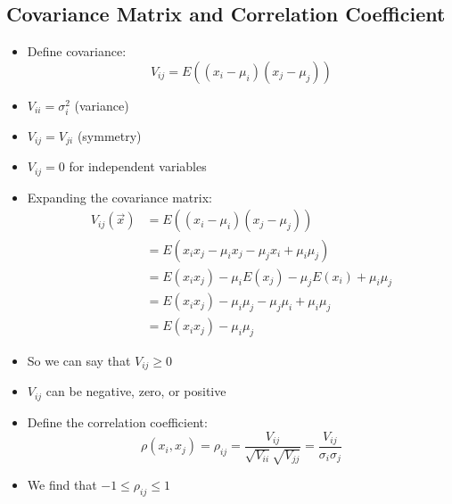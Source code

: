 \subsection{Covariance Matrix and Correlation Coefficient}
\begin{itemize}
      \item Define covariance:
            \[ V_{ij} = E((x_i - \mu_i)(x_j - \mu_j)) \]
      \item $V_{ii} = \sigma_i^2$ (variance)
      \item $V_{ij} = V_{ji}$ (symmetry)
      \item $V_{ij} = 0$ for independent variables
      \item Expanding the covariance matrix:
            \begin{align*}
                  V_{ij}(\vec{x}) & = E((x_i- \mu_i)(x_j - \mu_j))                           \\
                                  & = E(x_i x_j - \mu_i x_j - \mu_j x_i + \mu_i \mu_j)       \\
                                  & = E(x_i x_j) - \mu_i E(x_j) - \mu_j E(x_i) + \mu_i \mu_j \\
                                  & = E(x_i x_j) - \mu_i \mu_j - \mu_j \mu_i + \mu_i \mu_j   \\
                                  & = E(x_i x_j) - \mu_i \mu_j
            \end{align*}
      \item So we can say that $V_{ij} \ge 0$
      \item $V_{ij}$ can be negative, zero, or positive
      \item Define the correlation coefficient:
            \[ \rho(x_i, x_j) = \rho_{ij} = \frac{V_{ij}}{\sqrt{V_{ii}} \sqrt{V_{jj}}} = \frac{V_{ij}}{\sigma_i \sigma_j} \]
      \item We find that $-1 \le \rho_{ij} \le 1$
\end{itemize}


